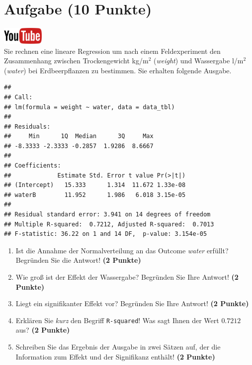 \documentclass[a4paper, 9pt]{scrartcl}\usepackage[]{graphicx}\usepackage[]{xcolor}
\makeatletter
\newenvironment{kframe}{%
 \def\at@end@of@kframe{}%
 \ifinner\ifhmode%
  \def\at@end@of@kframe{\end{minipage}}%
  \begin{minipage}{\columnwidth}%
 \fi\fi%
 \def\FrameCommand##1{\hskip\@totalleftmargin \hskip-\fboxsep
 \colorbox{shadecolor}{##1}\hskip-\fboxsep
     \hskip-\linewidth \hskip-\@totalleftmargin \hskip\columnwidth}%
 \MakeFramed {\advance\hsize-\width
   \@totalleftmargin\z@ \linewidth\hsize
   \@setminipage}}%
 {\par\unskip\endMakeFramed%
 \at@end@of@kframe}
\newenvironment{knitrout}{}{} %
\makeatother
\begin{document}
\section{Aufgabe \hfill (10 Punkte)}

\hfill\href{https://youtu.be/tNNzcndrpSk}{\includegraphics[width =
  2cm]{img/youtube}}\\[1Ex]

Sie rechnen eine lineare Regression um nach einem Feldexperiment den
Zusammenhang zwischen Trockengewicht kg/m$^2$ (\textit{weight}) und
Wassergabe l/m$^2$ (\textit{water}) bei Erdbeerpflanzen zu bestimmen. Sie
erhalten folgende \Rlogo Ausgabe.

\begin{knitrout}
\color{fgcolor}\begin{kframe}
\begin{verbatim}
## 
## Call:
## lm(formula = weight ~ water, data = data_tbl)
## 
## Residuals:
##     Min      1Q  Median      3Q     Max 
## -8.3333 -2.3333 -0.2857  1.9286  8.6667 
## 
## Coefficients:
##             Estimate Std. Error t value Pr(>|t|)
## (Intercept)   15.333      1.314  11.672 1.33e-08
## waterB        11.952      1.986   6.018 3.15e-05
## 
## Residual standard error: 3.941 on 14 degrees of freedom
## Multiple R-squared:  0.7212,	Adjusted R-squared:  0.7013 
## F-statistic: 36.22 on 1 and 14 DF,  p-value: 3.154e-05
\end{verbatim}
\end{kframe}
\end{knitrout}


\begin{enumerate}
\item Ist die Annahme der Normalverteilung an das Outcome \textit{water}
  erf{\"u}llt?  Begr{\"u}nden Sie die Antwort! \textbf{(2 Punkte)}
\item Wie gro{\ss} ist der Effekt der Wassergabe?  Begr{\"u}nden Sie Ihre Antwort! \textbf{(2 Punkte)} 
\item Liegt ein signifikanter
  Effekt vor? Begr{\"u}nden Sie Ihre Antwort! \textbf{(2 Punkte)}
\item Erkl{\"a}ren Sie \textit{kurz} den Begriff \texttt{R-squared}!
  Was sagt Ihnen der Wert $0.7212$ aus? \textbf{(2 Punkte)}
\item Schreiben Sie das Ergebnis der \Rlogo Ausgabe in zwei S{\"a}tzen auf, der die
  Information zum Effekt und der Signifikanz enth{\"a}lt! \textbf{(2 Punkte)} 
\end{enumerate}
 
\end{document}
